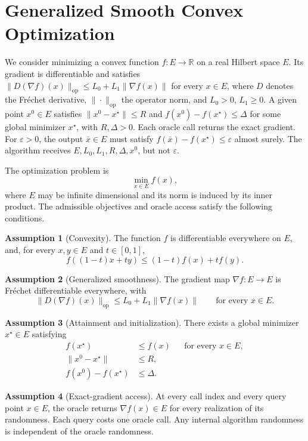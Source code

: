 \documentclass[10pt]{article}
\theoremstyle{definition}
\newtheorem{assumption}{Assumption}
\begin{document}
\section*{Generalized Smooth Convex Optimization}
We consider minimizing a convex function $f:E\to\mathbb{R}$ on a real Hilbert space $E$. Its gradient is differentiable and satisfies $\|D(\nabla f)(x)\|_{\mathrm{op}}\leq L_0+L_1\|\nabla f(x)\|$ for every $x\in E$, where $D$ denotes the Fr\'echet derivative, $\|\cdot\|_{\mathrm{op}}$ the operator norm, and $L_0>0$, $L_1\geq0$. A given point $x^0\in E$ satisfies $\|x^0-x^\star\|\leq R$ and $f(x^0)-f(x^\star)\leq\Delta$ for some global minimizer $x^\star$, with $R,\Delta>0$. Each oracle call returns the exact gradient. For $\varepsilon>0$, the output $\bar{x}\in E$ must satisfy $f(\bar{x})-f(x^\star)\leq\varepsilon$ almost surely. The algorithm receives $E,L_0,L_1,R,\Delta,x^0$, but not $\varepsilon$.

The optimization problem is
\[
\min_{x\in E} f(x),
\]
where $E$ may be infinite dimensional and its norm is induced by its inner product. The admissible objectives and oracle access satisfy the following conditions.

\begin{assumption}[Convexity]
The function $f$ is differentiable everywhere on $E$, and, for every $x,y\in E$ and $t\in[0,1]$,
\[
f((1-t)x+ty)\leq (1-t)f(x)+tf(y).
\]
\end{assumption}

\begin{assumption}[Generalized smoothness]
The gradient map $\nabla f:E\to E$ is Fr\'echet differentiable everywhere, with
\[
\|D(\nabla f)(x)\|_{\mathrm{op}}
\leq L_0+L_1\|\nabla f(x)\|
\qquad\text{for every }x\in E.
\]
\end{assumption}

\begin{assumption}[Attainment and initialization]
There exists a global minimizer $x^\star\in E$ satisfying
\[
\begin{aligned}
f(x^\star)&\leq f(x) &&\text{for every }x\in E,\\
\|x^0-x^\star\|&\leq R,\\
f(x^0)-f(x^\star)&\leq\Delta.
\end{aligned}
\]
\end{assumption}

\begin{assumption}[Exact-gradient access]
At every call index and every query point $x\in E$, the oracle returns $\nabla f(x)\in E$ for every realization of its randomness. Each query costs one oracle call. Any internal algorithm randomness is independent of the oracle randomness.
\end{assumption}
\end{document}
